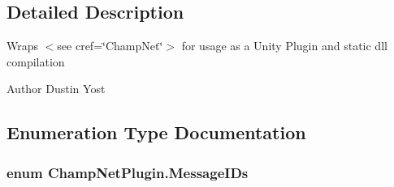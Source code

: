 \subsection{Detailed Description}
Wraps $<$see cref=\char`\"{}\-Champ\-Net\char`\"{}$>$ for usage as a Unity Plugin and static dll compilation \begin{DoxyAuthor}{Author}
Dustin Yost 
\end{DoxyAuthor}


\subsection{Enumeration Type Documentation}
\hypertarget{namespace_champ_net_plugin_a2ade5cfa7cf6c25ab7236c6b54a57821}{
\subsubsection[{Message\-I\-Ds}]{\setlength{\rightskip}{0pt plus 5cm}enum {\bf Champ\-Net\-Plugin.\-Message\-I\-Ds}}}\label{namespace_champ_net_plugin_a2ade5cfa7cf6c25ab7236c6b54a57821}
